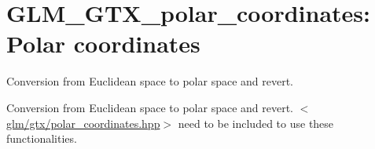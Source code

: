 \hypertarget{group__gtx__polar__coordinates}{\section{\-G\-L\-M\-\_\-\-G\-T\-X\-\_\-polar\-\_\-coordinates\-: \-Polar coordinates}
\label{group__gtx__polar__coordinates}
}


\-Conversion from \-Euclidean space to polar space and revert.  


\-Conversion from \-Euclidean space to polar space and revert. $<$\hyperlink{polar__coordinates_8hpp}{glm/gtx/polar\-\_\-coordinates.\-hpp}$>$ need to be included to use these functionalities. 